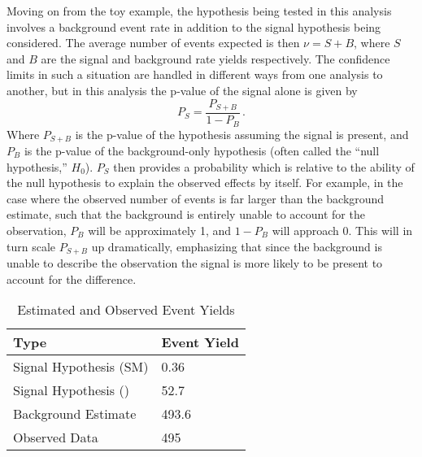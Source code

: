     Moving on from the toy example, the hypothesis being tested in this analysis
        involves a background event rate in addition to the signal hypothesis being considered.
    The average number of events expected is then $\nu = S + B$,
        where $S$ and $B$ are the signal and background rate yields respectively.
    The confidence limits in such a situation are handled in different ways from one analysis to another,
        but in this analysis the p-value of the signal alone is given by
    \begin{equation}
        P_S = \frac{P_{S+B}}{1 - P_B}
        \,.
    \end{equation}
    Where $P_{S+B}$ is the p-value of the hypothesis assuming the signal is present,
        and $P_B$ is the p-value of the background-only hypothesis
        (often called the ``null hypothesis,'' $H_0$)\cite{Barlow:2019svl}.
    $P_S$ then provides a probability which is relative to the ability of the null hypothesis to explain the observed effects by itself.
    For example, in the case where the observed number of events is far larger than the background estimate,
        such that the background is entirely unable to account for the observation,
        $P_B$ will be approximately 1, and $1-P_B$ will approach 0.
    This will in turn scale $P_{S+B}$ up dramatically,
        emphasizing that since the background is unable to describe the observation
        the signal is more likely to be present to account for the difference.

    \begin{table}[tbh]
       \begin{center}
           \caption{Estimated and Observed Event Yields}
           \label{tab:event_yield}
           \footnotesize
           \begin{tabular}{|l|l|}
           \toprule
               Type  &	Event Yield \\
               \midrule
               Signal Hypothesis (SM) & 0.36 \\
               Signal Hypothesis (\kvv=3) & 52.7 \\
               Background Estimate  & 493.6 \\
               Observed Data & 495 \\
           \bottomrule
           \end{tabular}
       \end{center}
    \end{table}

